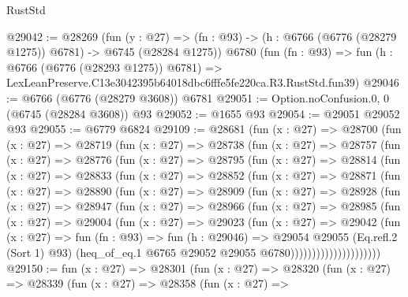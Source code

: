 \begin{lexlean}{RustStd}
\begin{coremodule}
@29042 := @28269
    (fun (y : @27) =>
    (fn : @93) -> (h : @6766 (@6776 (@28279 @1275)) @6781) -> @6745 (@28284 @1275))
    @6780
    (fun (fn : @93) =>
    fun (h : @6766 (@6776 (@28293 @1275)) @6781) =>
    LexLeanPreserve.C13e3042395b64018dbc6fffe5fe220ca.R3.RustStd.fun39)
@29046 := @6766 (@6776 (@28279 @3608)) @6781
@29051 := Option.noConfusion.{0, 0} (@6745 (@28284 @3608)) @93
@29052 := @1655 @93
@29054 := @29051 @29052 @93
@29055 := @6779 @6824
@29109 := @28681
    (fun (x : @27) =>
    @28700
      (fun (x : @27) =>
      @28719
        (fun (x : @27) =>
        @28738
          (fun (x : @27) =>
          @28757
            (fun (x : @27) =>
            @28776
              (fun (x : @27) =>
              @28795
                (fun (x : @27) =>
                @28814
                  (fun (x : @27) =>
                  @28833
                    (fun (x : @27) =>
                    @28852
                      (fun (x : @27) =>
                      @28871
                        (fun (x : @27) =>
                        @28890
                          (fun (x : @27) =>
                          @28909
                            (fun (x : @27) =>
                            @28928
                              (fun (x : @27) =>
                              @28947
                                (fun (x : @27) =>
                                @28966
                                  (fun (x : @27) =>
                                  @28985
                                    (fun (x : @27) =>
                                    @29004
                                      (fun (x : @27) =>
                                      @29023
                                        (fun (x : @27) =>
                                        @29042
                                          (fun (x : @27) =>
                                          fun (fn : @93) =>
                                          fun (h : @29046) =>
                                          @29054
                                            @29055
                                            (Eq.refl.{2} (Sort 1) @93)
                                            (heq_of_eq.{1}
                                              @6765
                                              @29052
                                              @29055
                                              @6780)))))))))))))))))))))
@29150 := fun (x : @27) =>
  @28301
    (fun (x : @27) =>
    @28320
      (fun (x : @27) =>
      @28339
        (fun (x : @27) =>
        @28358
          (fun (x : @27) =>

\end{coremodule}
\end{lexlean}
